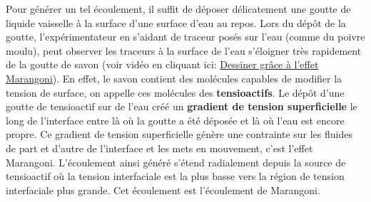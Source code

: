 \documentclass[french, 10pt]{article}
\begin{document}

Pour générer un tel écoulement, il suffit de déposer délicatement une goutte de liquide vaisselle à la surface d'une surface d'eau au repos. Lors du dépôt de la goutte, l'expérimentateur en s'aidant de traceur posés sur l'eau (comme du poivre moulu), peut observer les traceurs à la surface de l'eau s'éloigner très rapidement de la goutte de savon (voir vidéo en cliquant ici: \href{https://hebergement.universite-paris-saclay.fr/supraconductivite/marangoni/marangoni.html#home}{\og{} Dessiner grâce à l'effet Marangoni\fg{}}). En effet, le savon contient des molécules capables de modifier la tension de surface, on appelle ces molécules des \textbf{tensioactifs}. Le dépôt d'une goutte de tensioactif sur de l'eau créé un \textbf{gradient de tension superficielle} le long de l'interface entre là où la goutte a été déposée et là où l'eau est encore propre. Ce gradient de tension superficielle génère une contrainte sur les fluides de part et d'autre de l'interface et les mets en mouvement, c'est l'effet Marangoni. L'écoulement ainsi généré s'étend radialement depuis la source de tensioactif où la tension interfaciale est la plus basse vers la région de tension interfaciale plus grande. Cet écoulement est l'écoulement de Marangoni.\medskip
\end{document}
